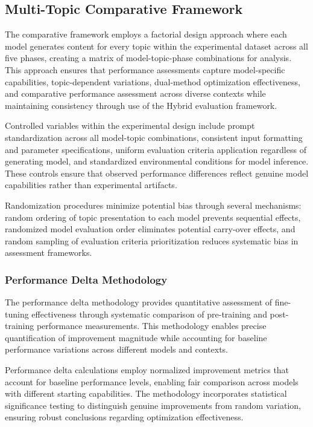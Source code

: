 \subsection{Multi-Topic Comparative Framework}

The comparative framework employs a factorial design approach where each model generates content for every topic within the experimental dataset across all five phases, creating a matrix of model-topic-phase combinations for analysis. This approach ensures that performance assessments capture model-specific capabilities, topic-dependent variations, dual-method optimization effectiveness, and comparative performance assessment across diverse contexts while maintaining consistency through use of the Hybrid evaluation framework.

Controlled variables within the experimental design include prompt standardization across all model-topic combinations, consistent input formatting and parameter specifications, uniform evaluation criteria application regardless of generating model, and standardized environmental conditions for model inference. These controls ensure that observed performance differences reflect genuine model capabilities rather than experimental artifacts.

Randomization procedures minimize potential bias through several mechanisms: random ordering of topic presentation to each model prevents sequential effects, randomized model evaluation order eliminates potential carry-over effects, and random sampling of evaluation criteria prioritization reduces systematic bias in assessment frameworks.

\subsubsection{Performance Delta Methodology}

The performance delta methodology provides quantitative assessment of fine-tuning effectiveness through systematic comparison of pre-training and post-training performance measurements. This methodology enables precise quantification of improvement magnitude while accounting for baseline performance variations across different models and contexts.

Performance delta calculations employ normalized improvement metrics that account for baseline performance levels, enabling fair comparison across models with different starting capabilities. The methodology incorporates statistical significance testing to distinguish genuine improvements from random variation, ensuring robust conclusions regarding optimization effectiveness.

